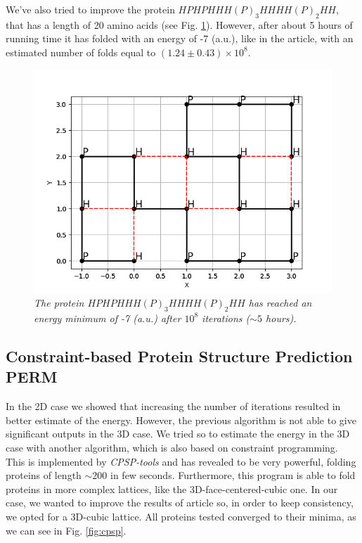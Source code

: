 We've also tried to improve the protein $HPHPHHH(P)_3HHHH(P)_2HH$, that has a length of 20 amino acids (see Fig. \ref{fig:18_2}).
However, after about 5 hours of running time it has folded with an energy of -7 (a.u.), like in the article, with an estimated number of folds equal to $(1.24 \pm 0.43) \times 10^8$.
\begin{figure}[H]
    \centering
    \includegraphics[width=.75\textwidth]{./img/18_2.png}
    \caption{\emph{The protein $HPHPHHH(P)_3HHHH(P)_2HH$ has reached an energy minimum of -7 (a.u.) after $10^8$ iterations ($\sim 5$ hours).}}
    \label{fig:18_2}
\end{figure}

\subsection{Constraint-based Protein Structure Prediction PERM}
In the 2D case we showed that increasing the number of iterations resulted in better estimate of the energy.
However, the previous algorithm is not able to give significant outputs in the 3D case.
We tried so to estimate the energy in the 3D case with another algorithm, which is also based on constraint programming.
This is implemented by \emph{CPSP-tools} \cite{cpsp} and has revealed to be very powerful, folding proteins of length $\sim 200$ in few seconds.
Furthermore, this program is able to fold proteins in more complex lattices, like the 3D-face-centered-cubic one.
In our case, we wanted to improve the results of article \cite{PERM} so, in order to keep consistency, we opted for a 3D-cubic lattice.
All proteins tested converged to their minima, as we can see in Fig. \ref{fig:cpsp}.

